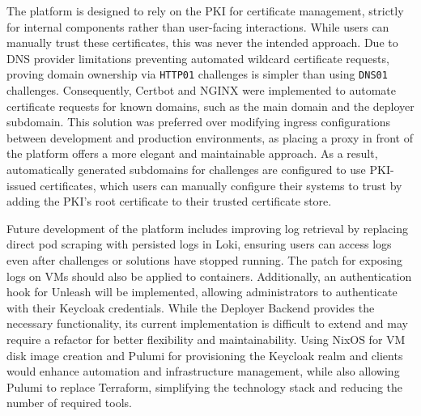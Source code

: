 The platform is designed to rely on the PKI for certificate management, strictly for internal components rather than user-facing interactions. While users can manually trust these certificates, this was never the intended approach. Due to DNS provider limitations preventing automated wildcard certificate requests, proving domain ownership via \texttt{HTTP01} challenges is simpler than using \texttt{DNS01} challenges. Consequently, Certbot and NGINX were implemented to automate certificate requests for known domains, such as the main domain and the deployer subdomain. This solution was preferred over modifying ingress configurations between development and production environments, as placing a proxy in front of the platform offers a more elegant and maintainable approach. As a result, automatically generated subdomains for challenges are configured to use PKI-issued certificates, which users can manually configure their systems to trust by adding the PKI's root certificate to their trusted certificate store.

Future development of the platform includes improving log retrieval by replacing direct pod scraping with persisted logs in Loki, ensuring users can access logs even after challenges or solutions have stopped running. The patch for exposing logs on VMs should also be applied to containers. Additionally, an authentication hook for Unleash will be implemented, allowing administrators to authenticate with their Keycloak credentials. While the Deployer Backend provides the necessary functionality, its current implementation is difficult to extend and may require a refactor for better flexibility and maintainability. Using NixOS for VM disk image creation and Pulumi for provisioning the Keycloak realm and clients would enhance automation and infrastructure management, while also allowing Pulumi to replace Terraform, simplifying the technology stack and reducing the number of required tools.

\cleardoublepage
{}
{}
\printbibliography
